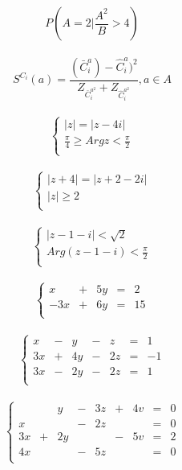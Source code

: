 \documentclass[20pt, letterpaper, titlepage]{article}
\begin{document}
\begin{LARGE}
$$
P{\left( A = 2 \bigg| \frac{A^2}{B} > 4 \right)}
$$\\


$$ S^{C_i}(a) = \frac{(\bar{C}_i^a) - \hat{C}_i^a)^2}{Z_{\bar{C}_i^{a^2}} + Z_{\hat{C}^{a^2}_i }}, a \in A $$\\

$$
\begin{cases}
|z| = |z - 4i| \\
\frac{\pi}{4} \geq Arg z < \frac{\pi}{2}\\
\end{cases}
$$\\

$$
\begin{cases}
|z + 4| = |z + 2 - 2i|\\
|z| \geq 2\\
\end{cases}
$$\\

$$
\begin{cases}
|z - 1 - i| < \sqrt{2}\\
Arg(z - 1 - i) < \frac{\pi}{2}\\
\end{cases}
$$\\

$$
\left\{
\begin{array}{rrrrr}
x & + & 5y & = & 2 \\
-3x & + & 6y & = & 15\\
\end{array}
\right.
$$\\

$$
\left\{
\begin{array}{rrrrrrr}
x & - & y & - & z & = & 1\\
3x & + & 4y & - & 2z & = & -1\\
3x & - & 2y & - & 2z & = & 1\\
\end{array}
\right.
$$\\

$$
\left\{
\begin{array}{rrrrrrrrr}
  &   & y & - & 3z & + & 4v & = & 0\\
x &  &  & - & 2z &  &  & = & 0\\
3x & + & 2y &   &   & - & 5v & = & 2\\
4x &  &  & - & 5z &  &  & = & 0\\
\end{array}
\right.
$$\\


\end{LARGE}
\end{document}
